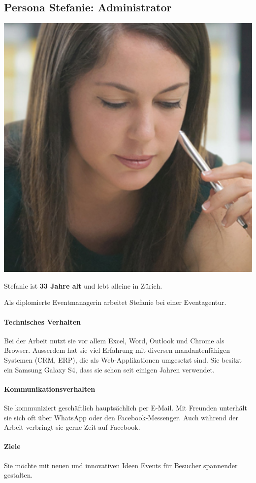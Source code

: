 \newpage

\subsection{Persona Stefanie: Administrator}
\begin{minipage}{0.25\textwidth}
\centering
	\includegraphics[width=1\textwidth]{images/persona-stefanie.jpg}
	\label{fig:stefanie}
\end{minipage}
\hfill %
\begin{minipage}{0.70\textwidth}
Stefanie ist \textbf{33 Jahre alt} und lebt alleine in Zürich.

Als diplomierte Eventmanagerin arbeitet Stefanie bei einer Eventagentur.

\paragraph{Technisches Verhalten}
Bei der Arbeit nutzt sie vor allem Excel, Word, Outlook und Chrome als Browser. Ausserdem hat sie viel Erfahrung mit diversen mandantenfähigen Systemen (CRM, ERP), die als Web-Applikationen umgesetzt sind. Sie besitzt ein Samsung Galaxy S4, dass sie schon seit einigen Jahren verwendet.
\paragraph{Kommunikationsverhalten}
Sie kommuniziert geschäftlich hauptsächlich per E-Mail. Mit Freunden unterhält sie sich oft über WhatsApp oder den Facebook-Messenger. Auch während der Arbeit verbringt sie gerne Zeit auf Facebook.
\paragraph{Ziele}
Sie möchte mit neuen und innovativen Ideen Events für Besucher spannender gestalten.
\end{minipage}

